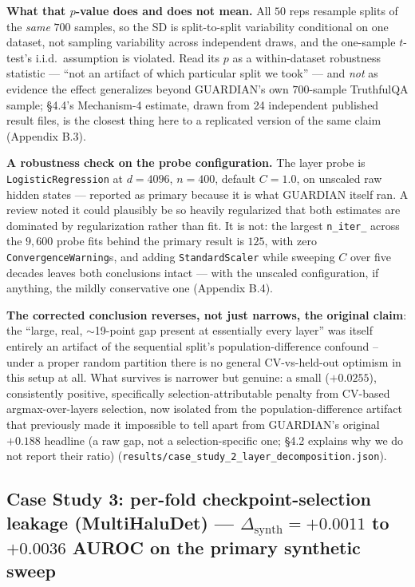 \documentclass[10pt]{article} %
\begin{document}
\textbf{What that $p$-value does and does not mean.} All $50$ reps resample
splits of the \emph{same} $700$ samples, so the SD is split-to-split
variability conditional on one dataset, not sampling variability across
independent draws, and the one-sample $t$-test's i.i.d.\ assumption is
violated. Read its $p$ as a within-dataset robustness statistic ---  ``not an
artifact of which particular split we took'' --- and \emph{not} as evidence the
effect generalizes beyond GUARDIAN's own $700$-sample TruthfulQA sample; §4.4's
Mechanism-4 estimate, drawn from 24 independent published result files, is the
closest thing here to a replicated version of the same claim (Appendix B.3).

\textbf{A robustness check on the probe configuration.} The layer probe is
\texttt{LogisticRegression} at $d=4096$, $n=400$, default $C=1.0$, on unscaled
raw hidden states --- reported as primary because it is what GUARDIAN itself
ran. A review noted it could plausibly be so heavily regularized that both
estimates are dominated by regularization rather than fit. It is not: the
largest \texttt{n\_iter\_} across the $9{,}600$ probe fits behind the primary
result is $125$, with zero \texttt{ConvergenceWarning}s, and adding
\texttt{StandardScaler} while sweeping $C$ over five decades leaves both
conclusions intact --- with the unscaled configuration, if anything, the mildly
conservative one (Appendix B.4).

\textbf{The corrected conclusion reverses, not just narrows, the original
claim}: the ``large, real, $\sim$19-point gap present at essentially every
layer'' was itself entirely an artifact of the sequential split's
population-difference confound -- under a proper random partition there is
no general CV-vs-held-out optimism in this setup at all. What survives is
narrower but genuine: a small ($+0.0255$), consistently positive,
specifically selection-attributable penalty from CV-based argmax-over-layers
selection, now isolated from the population-difference artifact that
previously made it impossible to tell apart from GUARDIAN's original
$+0.188$ headline (a raw gap, not a selection-specific one; §4.2 explains why
we do not report their ratio) (\texttt{results/case\_study\_2\_layer\_decomposition.json}).

\subsection{Case Study 3: per-fold checkpoint-selection leakage (MultiHaluDet) --- $\Delta_{\text{synth}}=+0.0011$ to $+0.0036$ AUROC on the primary synthetic sweep}
\end{document}
